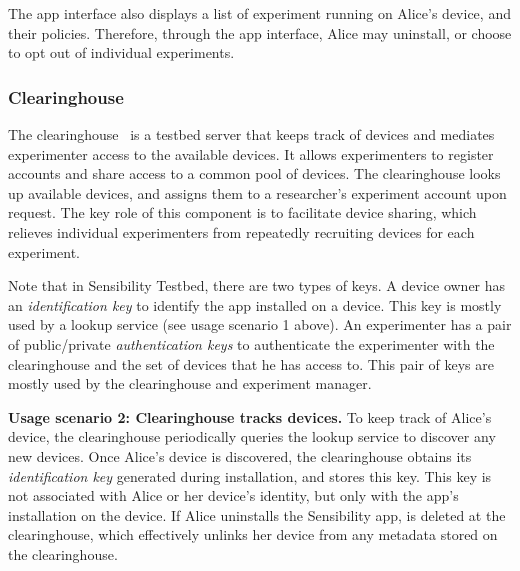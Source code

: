 The app interface also displays a list of experiment running
on Alice's device, and their policies. Therefore, 
through the app interface, Alice may uninstall, or 
choose to opt out of individual experiments. 

\subsubsection{Clearinghouse}\label{sec-ch}
The clearinghouse~\cite{ch} is a testbed server that keeps 
track of devices and mediates experimenter access to the 
available devices. It allows experimenters to register 
accounts and share access to a common pool of devices.
The clearinghouse looks up available devices, and assigns
them to a researcher's experiment account upon request. 
The key role of this component is to facilitate device sharing, 
which relieves individual experimenters from repeatedly 
recruiting devices for each experiment.

Note that in Sensibility Testbed, there are two types of keys. A device
owner has an \textit{identification key} to identify the app installed on a 
device. This key is mostly used by a lookup service (see usage scenario 
1 above). An experimenter has a pair of public/private \textit{authentication 
keys} to authenticate the experimenter with the clearinghouse and 
the set of devices that he has access to. This pair of keys are mostly 
used by the clearinghouse and experiment manager.


\textbf{Usage scenario 2: Clearinghouse tracks devices.}
To keep track of Alice's device, the
clearinghouse periodically queries the lookup service to
discover any new devices. Once Alice's device is discovered, the
clearinghouse obtains its \textit{identification key}  generated
during installation, and stores this key. 
This key is not associated with Alice or her
device's identity, but only with the app's installation on the device. If
Alice uninstalls the Sensibility app,  is
deleted at the clearinghouse, which effectively unlinks
her device from any metadata stored on the clearinghouse.

